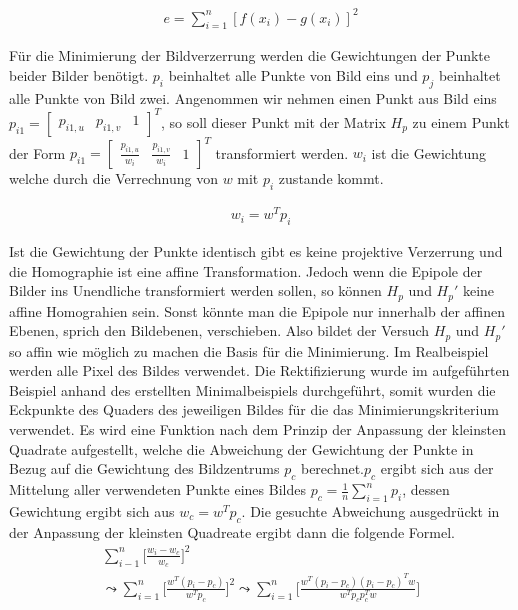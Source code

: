 \begin{gather}
	e = \sum_{i=1}^{n}[f(x_i)-g(x_i)]^2
\end{gather}

Für die Minimierung der Bildverzerrung werden die Gewichtungen der Punkte beider Bilder benötigt. $p_i$ beinhaltet alle Punkte von Bild eins und $p_j$ beinhaltet alle Punkte von Bild zwei. Angenommen wir nehmen einen Punkt aus Bild eins $p_{i1} = \begin{bmatrix}p_{i1,u}&p_{i1,v}&1\end{bmatrix}^T$, so soll dieser Punkt mit der Matrix $H_p$ zu einem Punkt der Form  $p_{i1} = \begin{bmatrix}\frac{p_{i1,u}}{w_i}&\frac{p_{i1,v}}{w_i}&1\end{bmatrix}^T$ transformiert werden. $w_i$ ist die Gewichtung welche durch die Verrechnung von $w$ mit $p_i$ zustande kommt.

\begin{gather}
	w_i=w^Tp_i
\end{gather} 

Ist die Gewichtung der Punkte identisch gibt es keine projektive Verzerrung und die Homographie ist eine affine Transformation. Jedoch wenn die Epipole der Bilder ins Unendliche transformiert werden sollen, so können $H_p$ und $H_p'$ keine affine Homograhien sein. Sonst könnte man die Epipole nur innerhalb der affinen Ebenen, sprich den Bildebenen, verschieben. Also bildet der Versuch $H_p$ und $H_p'$ so affin wie möglich zu machen die Basis für die Minimierung. Im Realbeispiel werden alle Pixel des Bildes verwendet. Die Rektifizierung wurde im aufgeführten Beispiel anhand des erstellten Minimalbeispiels durchgeführt, somit wurden die Eckpunkte des Quaders des jeweiligen Bildes für die das Minimierungskriterium verwendet. Es wird eine Funktion nach dem Prinzip der Anpassung der kleinsten Quadrate aufgestellt, welche die Abweichung der Gewichtung der Punkte in Bezug auf die Gewichtung des Bildzentrums $p_c$ berechnet.$p_c$ ergibt sich aus der Mittelung aller verwendeten Punkte eines Bildes $p_c = \frac{1}{n} \sum_{i=1}^{n} p_i$, dessen Gewichtung ergibt sich aus $w_c= w^T p_c$. Die gesuchte Abweichung ausgedrückt in der Anpassung der kleinsten Quadreate ergibt dann die folgende Formel.\\

\begin{gather}
	\sum_{i-1}^{n}\Big[\frac{w_i-w_c}{w_c} \Big]^2\\
	\leadsto \sum_{i=1}^{n}\Big[\frac{w^T (p_i-p_c)}{w^Tp_c} \Big]^2
	\leadsto \sum_{i=1}^{n}\Big[\frac{w^T (p_i-p_c)(p_i-p_c)^Tw}{w^Tp_cp_c^Tw} \Big]
\end{gather}\\

